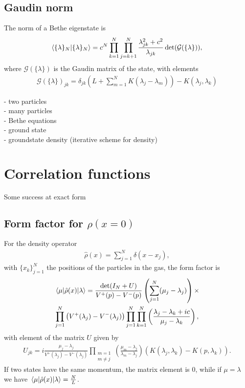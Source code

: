 \documentclass[11pt, a4paper]{report} %
\begin{document}
\subsection{Gaudin norm}
The norm of a Bethe eigenstate is \cite{Caux2007}
\begin{align}
  \braket{\{\lambda\}_N}{\{\lambda\}_N} = c^N \prod_{k=1}^N \prod_{j=k+1}^N \frac{\lambda_{jk}^2 + c^2}{\lambda_{jk}} \det(\mathcal{G}(\{\lambda\})),
\end{align}
where $\mathcal{G}(\{\lambda\})$ is the Gaudin matrix of the state, with elements
\begin{align}
  \mathcal{G}(\{\lambda\})_{jk} = \delta_{jk} \left(L + \sum_{m=1}^NK(\lambda_j-\lambda_m)\right) - K(\lambda_j, \lambda_k)
\end{align}


- two particles \\
- many particles\\
- Bethe equations\\
- ground state\\
- groundstate density (iterative scheme for density)\cite{Zemyan2012}




\section{Correlation functions}
Some success at exact form \cite{Nardis2016}
\cite{slavnov89_calcul_scalar_produc_wave_funct}


\subsection{Form factor for $\rho(x=0)$}
For the density operator
\begin{align}
  \hat{\rho}(x) = \sum_{j=1}^N \delta(x-x_j),
\end{align}
with \(\{x_k\}_{j=1}^N\) the positions of the particles in the gas, the form factor is \cite{slavnov90_noneq_time_curren_correl_funct, Nardis2015}
\begin{multline}
  \matrixel{\mathbf{\mu}}{\hat{\rho}(x)}{\mathbf{\lambda}} = \frac{\det(I_N +U)}{V^+(p) - V^-(p)}
  \left(\sum_{j=1}^N(\mu_j-\lambda_j)\right) \times\\ \prod_{j=1}^N\left(V^+(\lambda_j) - V^-(\lambda_j)\right)\prod_{j=1}^N\prod_{k=1}^N\left(\frac{\lambda_j-\lambda_k+ic}{\mu_j-\lambda_k}\right),
\end{multline}
with element of the matrix \(U\) given by
\begin{align}
  U_{jk} = i \frac{\mu_j-\lambda_j}{V^+(\lambda_j) -V^-(\lambda_j)}\prod_{\substack{m=1\\m\neq j}} \left(\frac{\mu_m - \lambda_j}{\lambda_m-\lambda_j}\right) \left(K(\lambda_j, \lambda_k) - K(p, \lambda_k)\right).
\end{align}
If two states have the same momentum, the matrix element is 0, while if $\mu = \lambda$ we have $\matrixel{\mathbf{\mu}}{\hat{\rho}(x)}{\mathbf{\lambda}}=\frac{N}{L}$.
\end{document}
